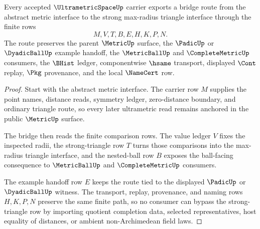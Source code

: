 \begin{theorem}
\label{thm:ultrametric-space-strong-triangle-bridge-route}
Every accepted $\UltrametricSpaceUp$ carrier exports a bridge route from the abstract metric interface to the strong max-radius triangle interface through the finite rows
$$
M,V,T,B,E,H,K,P,N .
$$
The route preserves the parent $\MetricUp$ surface, the $\PadicUp$ or $\DyadicBallUp$ example handoff, the $\MetricBallUp$ and $\CompleteMetricUp$ consumers, the $\BHist$ ledger, componentwise $\hsame$ transport, displayed $\Cont$ replay, $\Pkg$ provenance, and the local $\NameCert$ row.
\end{theorem}
\begin{proof}
Start with the abstract metric interface. The carrier row $M$ supplies the point names, distance reads, symmetry ledger, zero-distance boundary, and ordinary triangle route, so every later ultrametric read remains anchored in the public $\MetricUp$ surface.

The bridge then reads the finite comparison rows. The value ledger $V$ fixes the inspected radii, the strong-triangle row $T$ turns those comparisons into the max-radius triangle interface, and the nested-ball row $B$ exposes the ball-facing consequence to $\MetricBallUp$ and $\CompleteMetricUp$ consumers.

The example handoff row $E$ keeps the route tied to the displayed $\PadicUp$ or $\DyadicBallUp$ witness. The transport, replay, provenance, and naming rows $H,K,P,N$ preserve the same finite path, so no consumer can bypass the strong-triangle row by importing quotient completion data, selected representatives, host equality of distances, or ambient non-Archimedean field laws.
\end{proof}



